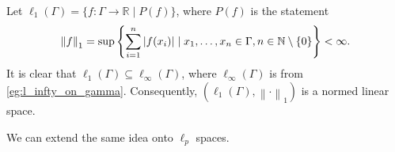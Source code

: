 \documentclass[notoc,notitlepage]{tufte-book}
\newcommand{\norm}[1]{\left\| #1 \right\|}
\begin{document}
\begin{eg}
  Let $\ell_1(\Gamma) = \{ f : \Gamma \to \mathbb{R} \mid P(f) \}$, where $P(f)$ is the statement
  \begin{equation*}
    \norm{f}_1 = \sup \left\{ \sum_{i=1}^{n} \abs{f(x_i)} \mid x_1, \ldots, x_n \in \Gamma, n \in \mathbb{N} \setminus \{ 0 \} \right\} < \infty.
  \end{equation*}
  It is clear that $\ell_1(\Gamma) \subseteq \ell_\infty(\Gamma)$, where $\ell_\infty(\Gamma)$ is from \cref{eg:l_infty_on_gamma}. Consequently, $(\ell_1(\Gamma), \norm\cdot_1)$ is a normed linear space.
\end{eg}

We can extend the same idea onto $\ell_p$ spaces.
\end{document}
